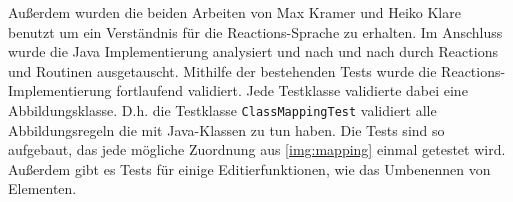 \documentclass[ngerman,runningheads]{llncs}
\begin{document}
Außerdem wurden die beiden Arbeiten von Max Kramer \cite{kramer2017a} und Heiko Klare \cite{klare2016} benutzt um ein Verständnis für die Reactions-Sprache zu erhalten. Im Anschluss wurde die Java Implementierung analysiert und nach und nach durch Reactions und Routinen ausgetauscht. Mithilfe der bestehenden Tests wurde die Reactions-Implementierung fortlaufend validiert. Jede Testklasse validierte dabei eine Abbildungsklasse. D.h. die Testklasse \texttt{ClassMappingTest} validiert alle Abbildungsregeln die mit Java-Klassen zu tun haben. Die Tests sind so aufgebaut, das jede mögliche Zuordnung aus \autoref{img:mapping} einmal getestet wird. Außerdem gibt es Tests für einige Editierfunktionen, wie das Umbenennen von Elementen. \par
\end{document}
